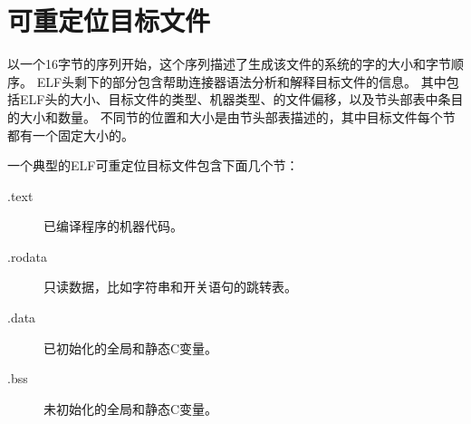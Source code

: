 
\section{可重定位目标文件}
{
    以一个16字节的序列开始，这个序列描述了生成该文件的系统的字的大小和字节顺序。
    ELF头剩下的部分包含帮助连接器语法分析和解释目标文件的信息。
    其中包括ELF头的大小、目标文件的类型、机器类型、的文件偏移，以及节头部表中条目的大小和数量。
    不同节的位置和大小是由节头部表描述的，其中目标文件每个节都有一个固定大小的。

    一个典型的ELF可重定位目标文件包含下面几个节：

    \begin{description}
        \item[.text] 已编译程序的机器代码。
        \item[.rodata] 只读数据，比如字符串和开关语句的跳转表。
        \item[.data] 已初始化的全局和静态C变量。
        \item[.bss] 未初始化的全局和静态C变量。
    \end{description}
}
